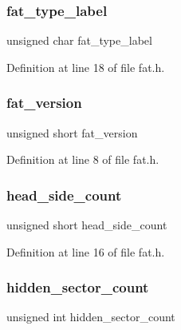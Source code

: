 \subsubsection{\texorpdfstring{fat\+\_\+type\+\_\+label}{fat\_type\_label}}
{\footnotesize\ttfamily unsigned char fat\+\_\+type\+\_\+label}



Definition at line 18 of file fat.\+h.

\mbox{\label{a00152_ab4a262a3a624c702e31a66fd3602a60d_ab4a262a3a624c702e31a66fd3602a60d}} 
\subsubsection{\texorpdfstring{fat\+\_\+version}{fat\_version}}
{\footnotesize\ttfamily unsigned short fat\+\_\+version}



Definition at line 8 of file fat.\+h.

\mbox{\label{a00152_a33263a0ce9b20cca4a493c961a5ade52_a33263a0ce9b20cca4a493c961a5ade52}} 
\subsubsection{\texorpdfstring{head\+\_\+side\+\_\+count}{head\_side\_count}}
{\footnotesize\ttfamily unsigned short head\+\_\+side\+\_\+count}



Definition at line 16 of file fat.\+h.

\mbox{\label{a00152_a0c59c66983eef3ab335aed301b09c3ba_a0c59c66983eef3ab335aed301b09c3ba}} 
\subsubsection{\texorpdfstring{hidden\+\_\+sector\+\_\+count}{hidden\_sector\_count}}
{\footnotesize\ttfamily unsigned int hidden\+\_\+sector\+\_\+count}



